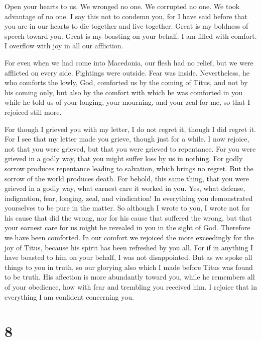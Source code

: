  Open your hearts to us. We wronged no one. We corrupted
no one. We took advantage of no one.  I say this not to
condemn you, for I have said before that you are in our hearts to die
together and live together.  Great is my boldness of
speech toward you. Great is my boasting on your behalf. I am filled with
comfort. I overflow with joy in all our affliction.

 For even when we had come into Macedonia, our flesh had
no relief, but we were afflicted on every side. Fightings were outside.
Fear was inside.  Nevertheless, he who comforts the lowly,
God, comforted us by the coming of Titus,  and not by his
coming only, but also by the comfort with which he was comforted in you
while he told us of your longing, your mourning, and your zeal for me,
so that I rejoiced still more.

 For though I grieved you with my letter, I do not regret
it, though I did regret it. For I see that my letter made you grieve,
though just for a while.  I now rejoice, not that you were
grieved, but that you were grieved to repentance. For you were grieved
in a godly way, that you might suffer loss by us in nothing.
 For godly sorrow produces repentance leading to
salvation, which brings no regret. But the sorrow of the world produces
death.  For behold, this same thing, that you were
grieved in a godly way, what earnest care it worked in you. Yes, what
defense, indignation, fear, longing, zeal, and vindication! In
everything you demonstrated yourselves to be pure in the matter.
 So although I wrote to you, I wrote not for his cause
that did the wrong, nor for his cause that suffered the wrong, but that
your earnest care for us might be revealed in you in the sight of God.
 Therefore we have been comforted. In our comfort we
rejoiced the more exceedingly for the joy of Titus, because his spirit
has been refreshed by you all.  For if in anything I have
boasted to him on your behalf, I was not disappointed. But as we spoke
all things to you in truth, so our glorying also which I made before
Titus was found to be truth.  His affection is more
abundantly toward you, while he remembers all of your obedience, how
with fear and trembling you received him.  I rejoice that
in everything I am confident concerning you.

\hypertarget{section-7}{%
\section{8}\label{section-7}}

